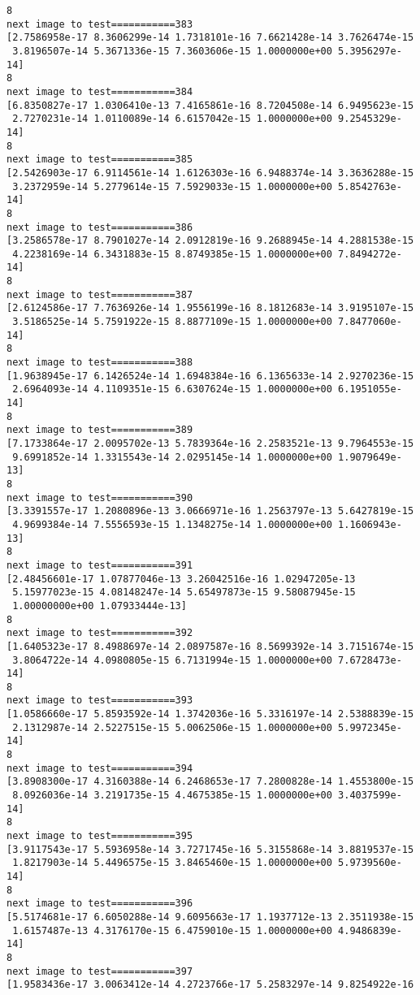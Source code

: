 \documentclass[11pt]{article}
\begin{document}
\begin{Verbatim}[commandchars=\\\{\}]
8
next image to test===========383
[2.7586958e-17 8.3606299e-14 1.7318101e-16 7.6621428e-14 3.7626474e-15
 3.8196507e-14 5.3671336e-15 7.3603606e-15 1.0000000e+00 5.3956297e-14]
8
next image to test===========384
[6.8350827e-17 1.0306410e-13 7.4165861e-16 8.7204508e-14 6.9495623e-15
 2.7270231e-14 1.0110089e-14 6.6157042e-15 1.0000000e+00 9.2545329e-14]
8
next image to test===========385
[2.5426903e-17 6.9114561e-14 1.6126303e-16 6.9488374e-14 3.3636288e-15
 3.2372959e-14 5.2779614e-15 7.5929033e-15 1.0000000e+00 5.8542763e-14]
8
next image to test===========386
[3.2586578e-17 8.7901027e-14 2.0912819e-16 9.2688945e-14 4.2881538e-15
 4.2238169e-14 6.3431883e-15 8.8749385e-15 1.0000000e+00 7.8494272e-14]
8
next image to test===========387
[2.6124586e-17 7.7636926e-14 1.9556199e-16 8.1812683e-14 3.9195107e-15
 3.5186525e-14 5.7591922e-15 8.8877109e-15 1.0000000e+00 7.8477060e-14]
8
next image to test===========388
[1.9638945e-17 6.1426524e-14 1.6948384e-16 6.1365633e-14 2.9270236e-15
 2.6964093e-14 4.1109351e-15 6.6307624e-15 1.0000000e+00 6.1951055e-14]
8
next image to test===========389
[7.1733864e-17 2.0095702e-13 5.7839364e-16 2.2583521e-13 9.7964553e-15
 9.6991852e-14 1.3315543e-14 2.0295145e-14 1.0000000e+00 1.9079649e-13]
8
next image to test===========390
[3.3391557e-17 1.2080896e-13 3.0666971e-16 1.2563797e-13 5.6427819e-15
 4.9699384e-14 7.5556593e-15 1.1348275e-14 1.0000000e+00 1.1606943e-13]
8
next image to test===========391
[2.48456601e-17 1.07877046e-13 3.26042516e-16 1.02947205e-13
 5.15977023e-15 4.08148247e-14 5.65497873e-15 9.58087945e-15
 1.00000000e+00 1.07933444e-13]
8
next image to test===========392
[1.6405323e-17 8.4988697e-14 2.0897587e-16 8.5699392e-14 3.7151674e-15
 3.8064722e-14 4.0980805e-15 6.7131994e-15 1.0000000e+00 7.6728473e-14]
8
next image to test===========393
[1.0586660e-17 5.8593592e-14 1.3742036e-16 5.3316197e-14 2.5388839e-15
 2.1312987e-14 2.5227515e-15 5.0062506e-15 1.0000000e+00 5.9972345e-14]
8
next image to test===========394
[3.8908300e-17 4.3160388e-14 6.2468653e-17 7.2800828e-14 1.4553800e-15
 8.0926036e-14 3.2191735e-15 4.4675385e-15 1.0000000e+00 3.4037599e-14]
8
next image to test===========395
[3.9117543e-17 5.5936958e-14 3.7271745e-16 5.3155868e-14 3.8819537e-15
 1.8217903e-14 5.4496575e-15 3.8465460e-15 1.0000000e+00 5.9739560e-14]
8
next image to test===========396
[5.5174681e-17 6.6050288e-14 9.6095663e-17 1.1937712e-13 2.3511938e-15
 1.6157487e-13 4.3176170e-15 6.4759010e-15 1.0000000e+00 4.9486839e-14]
8
next image to test===========397
[1.9583436e-17 3.0063412e-14 4.2723766e-17 5.2583297e-14 9.8254922e-16

\end{Verbatim}
\end{document}
